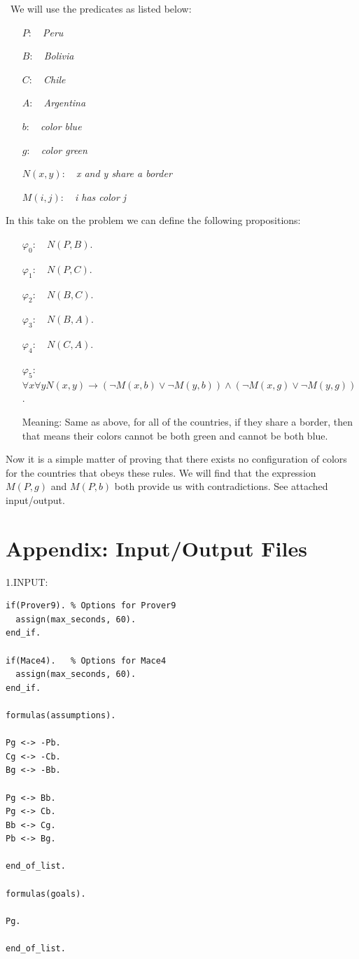 \documentclass[fullpage]{article}
\begin{document}
\begin{enumerate}[(a)]
 \ We will use the predicates as listed below:
\begin{itemize}
\item[$P$:]~ {\em Peru}
\item[$B$:]~ {\em Bolivia}
\item[$C$:]~ {\em Chile}
\item[$A$:]~ {\em Argentina}
\item[$b$:]~ {\em color blue}
\item[$g$:]~ {\em color green}
\item[$N(x,y)$:]~ {\em x and y share a border}
\item[$M(i,j)$:]~ {\em i has color j}
\end{itemize}
In this take on the problem we can define the following propositions:
\begin{itemize}
\item[$\varphi_0$:]~ ${N(P, B)}$.
\item[$\varphi_1$:]~ ${N(P, C)}$.
\item[$\varphi_2$:]~ ${N(B, C)}$.
\item[$\varphi_3$:]~ ${N(B, A)}$.
\item[$\varphi_4$:]~ ${N(C, A)}$.
\item[$\varphi_5$:]~ $\forall x \forall y{N(x, y) \rightarrow (\neg M(x, b) \vee \neg M(y, b)) \wedge (\neg M(x, g) \vee \neg M(y, g))}$.

Meaning: Same as above, for all of the countries, if they share a border, then that means their colors cannot be both green and cannot be both blue.
\end{itemize}

Now it is a simple matter of proving that there exists no configuration of colors for the countries that obeys these rules. We will find that the expression ${M(P, g)}$ and ${M(P, b)}$ both provide us with contradictions. See attached input/output.
\end{enumerate}

\newpage
\section*{Appendix: Input/Output Files}
1.INPUT:

 {\footnotesize \begin{verbatim}
if(Prover9). % Options for Prover9
  assign(max_seconds, 60).
end_if.

if(Mace4).   % Options for Mace4
  assign(max_seconds, 60).
end_if.

formulas(assumptions).

Pg <-> -Pb.
Cg <-> -Cb.
Bg <-> -Bb.

Pg <-> Bb.
Pg <-> Cb.
Bb <-> Cg.
Pb <-> Bg.

end_of_list.

formulas(goals).

Pg.

end_of_list.

\end{verbatim} }
\end{document}
